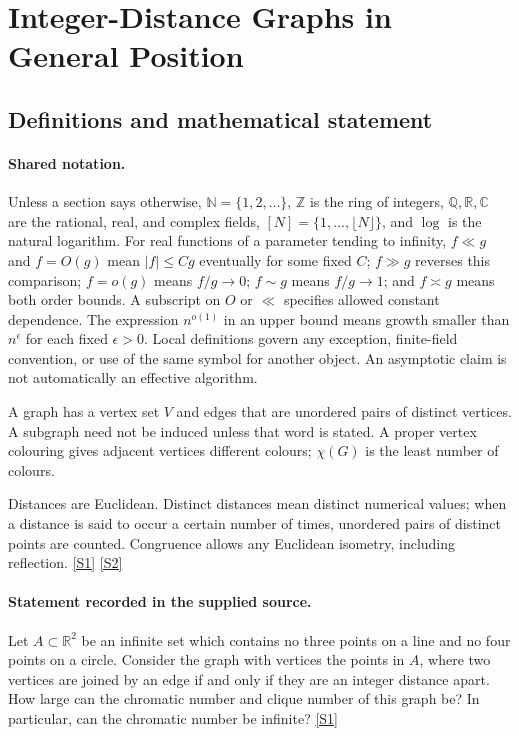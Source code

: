 \documentclass[11pt,a4paper]{article}
\newcommand{\N}{\mathbb{N}}
\newcommand{\Z}{\mathbb{Z}}
\newcommand{\Q}{\mathbb{Q}}
\newcommand{\R}{\mathbb{R}}
\newcommand{\C}{\mathbb{C}}
\newcommand{\sref}[2]{\hyperlink{source:#1:#2}{[S#2]}}
\begin{document}
\section{Integer-Distance Graphs in General Position}\label{statement}


\subsection{Definitions and mathematical statement}

\paragraph{Shared notation.}Unless a section says otherwise, $\N=\{1,2,\ldots\}$,
$\Z$ is the ring of integers, $\Q,\R,\C$ are the rational, real, and complex
fields, $[N]=\{1,\ldots,\lfloor N\rfloor\}$, and $\log$ is the natural
logarithm. For real functions of a parameter tending to infinity,
$f\ll g$ and $f=O(g)$ mean $|f|\leq Cg$ eventually for some fixed $C$;
$f\gg g$ reverses this comparison; $f=o(g)$ means $f/g\to0$;
$f\sim g$ means $f/g\to1$; and $f\asymp g$ means both order bounds.
A subscript on $O$ or $\ll$ specifies allowed constant dependence.
The expression $n^{o(1)}$ in an upper bound means growth smaller than
$n^\epsilon$ for each fixed $\epsilon>0$. Local definitions govern any
exception, finite-field convention, or use of the same symbol for another
object. An asymptotic claim is not automatically an effective algorithm.



A graph has a vertex set $V$ and edges that are unordered pairs of distinct vertices. A subgraph need not be induced unless that word is stated. A proper vertex colouring gives adjacent vertices different colours; $\chi(G)$ is the least number of colours.

Distances are Euclidean. Distinct distances mean distinct numerical values; when a distance is said to occur a certain number of times, unordered pairs of distinct points are counted. Congruence allows any Euclidean isometry, including reflection. \sref{statement}{1} \sref{statement}{2}

\paragraph{Statement recorded in the supplied source.}
Let $A\subset\mathbb{R}^2$ be an infinite set which contains no three points on a line and no four points on a circle. Consider the graph with vertices the points in $A$, where two vertices are joined by an edge if and only if they are an integer distance apart.
How large can the chromatic number and clique number of this graph be? In particular, can the chromatic number be infinite? \sref{statement}{1}
\end{document}

